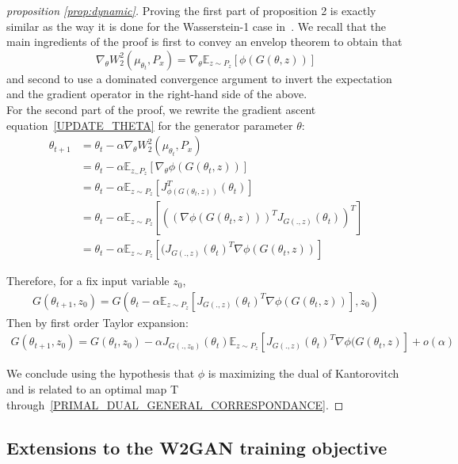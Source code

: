 \documentclass[runningheads]{llncs}
\newcommand\mycitet[1]{\cite{#1}}
\begin{document}
\begin{proof}[proposition \ref{prop:dynamic}]

Proving the first part of proposition 2 is exactly similar as the way it is done for the Wasserstein-1 case in~\mycitet{arjovsky2017wasserstein}. We recall that the main ingredients of the proof is first to convey an envelop theorem to obtain that 
\[\nabla_\theta W_2^2(\mu_{\theta_t},P_x)=\nabla_\theta \mathds{E}_{z\sim P_z}[\phi(G(\theta,z))]\]
and second to use a dominated convergence argument to invert the expectation and the gradient operator in the right-hand side of the above.\\
For the second part of the proof, we rewrite the gradient ascent equation~\eqref{UPDATE_THETA} for the generator parameter $\theta$:
\begin{equation}
    \begin{aligned}
    \theta_{t+1}&=\theta_t -\alpha \nabla_\theta W_2^2(\mu_{\theta_t},P_x)\\
    &= \theta_t -\alpha  \mathds{E}_{z_ \sim P_z}[\nabla_\theta \phi(G(\theta_t,z))]\\
    &=\theta_t -\alpha  \mathds{E}_{z \sim P_z}[J_{\phi(G(\theta_t,z))}^T(\theta_t)] \\
    &=\theta_t -\alpha  \mathds{E}_{z\sim P_z}[( (\nabla \phi(G(\theta_t,z)))^T J_{G(.,z)}(\theta_t) )^T]\\
    &=\theta_t -\alpha  \mathds{E}_{z\sim P_z}[(  J_{G(.,z)}(\theta_t)^T \nabla \phi(G(\theta_t,z)) ]
    \end{aligned}
\end{equation}

Therefore, for a fix input variable $z_0$,
\begin{align}
G(\theta_{t+1},z_0)= G(\theta_t -\alpha  \mathds{E}_{z\sim P_z}[  J_{G(.,z)}(\theta_t)^T \nabla \phi(G(\theta_t,z)) ],z_0)
\end{align}
Then by first order Taylor expansion: 
\begin{align}
G(\theta_{t+1},z_0)= G(\theta_t,z_0) -\alpha J_{G(.,z_0)}(\theta_t) \mathds{E}_{z\sim P_z}[  J_{G(.,z)}(\theta_t)^T \nabla \phi(G(\theta_t,z) ]  + o(\alpha)
\end{align}

We conclude using the hypothesis that $\phi$ is maximizing the dual of Kantorovitch and is related to an optimal map T through~\eqref{PRIMAL_DUAL_GENERAL_CORRESPONDANCE}.
\end{proof}

\subsection{Extensions to the W2GAN training objective}
\label{sec:objective_details}
\end{document}
